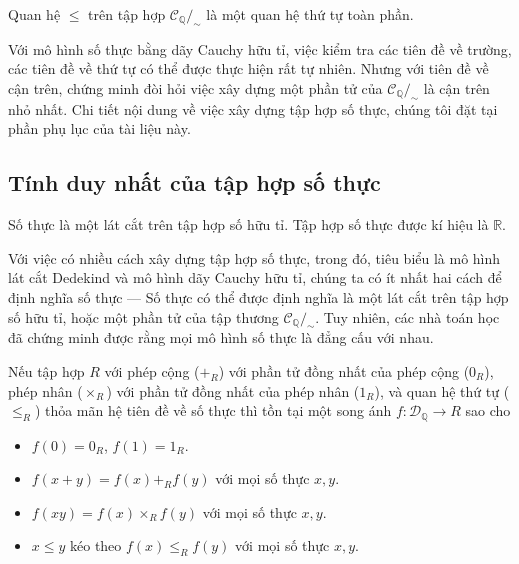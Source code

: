 \begin{theorem}
	Quan hệ $\leq$ trên tập hợp $\mathscr{C}_{\mathbb{Q}}/_{\sim}$ là một quan hệ thứ tự toàn phần.
\end{theorem}

Với mô hình số thực bằng dãy Cauchy hữu tỉ, việc kiểm tra các tiên đề về trường, các tiên đề về thứ tự có thể được thực hiện rất tự nhiên. Nhưng với tiên đề về cận trên, chứng minh đòi hỏi việc xây dựng một phần tử của $\mathscr{C}_{\mathbb{Q}}/_{\sim}$ là cận trên nhỏ nhất. Chi tiết nội dung về việc xây dựng tập hợp số thực, chúng tôi đặt tại phần phụ lục của tài liệu này.

\subsection{Tính duy nhất của tập hợp số thực}

\begin{definition}
	Số thực là một lát cắt trên tập hợp số hữu tỉ. Tập hợp số thực được kí hiệu là $\mathbb{R}$.
\end{definition}

Với việc có nhiều cách xây dựng tập hợp số thực, trong đó, tiêu biểu là mô hình lát cắt Dedekind và mô hình dãy Cauchy hữu tỉ, chúng ta có ít nhất hai cách để định nghĩa số thực --- Số thực có thể được định nghĩa là một lát cắt trên tập hợp số hữu tỉ, hoặc một phần tử của tập thương $\mathscr{C}_{\mathbb{Q}}/_{\sim}$. Tuy nhiên, các nhà toán học đã chứng minh được rằng mọi mô hình số thực là đẳng cấu với nhau.

\begin{theorem}\label{theorem:uniqueness-of-complete-ordered-field}
	Nếu tập hợp $R$ với phép cộng (${+}_{R}$) với phần tử đồng nhất của phép cộng ($0_{R}$), phép nhân (${\times}_{R}$) với phần tử đồng nhất của phép nhân ($1_{R}$), và quan hệ thứ tự ($\leq_{R}$) thỏa mãn hệ tiên đề về số thực thì tồn tại một song ánh $f: \mathscr{D}_{\mathbb{Q}}\to R$ sao cho
	\begin{itemize}[topsep=0pt,itemsep=0pt]
		\item $f(0) = 0_{R}$, $f(1) = 1_{R}$.
		\item $f(x + y) = f(x) +_{R} f(y)$ với mọi số thực $x, y$.
		\item $f(xy) = f(x) \times_{R} f(y)$ với mọi số thực $x, y$.
		\item $x\leq y$ kéo theo $f(x)\leq_{R} f(y)$ với mọi số thực $x, y$.
	\end{itemize}
\end{theorem}

